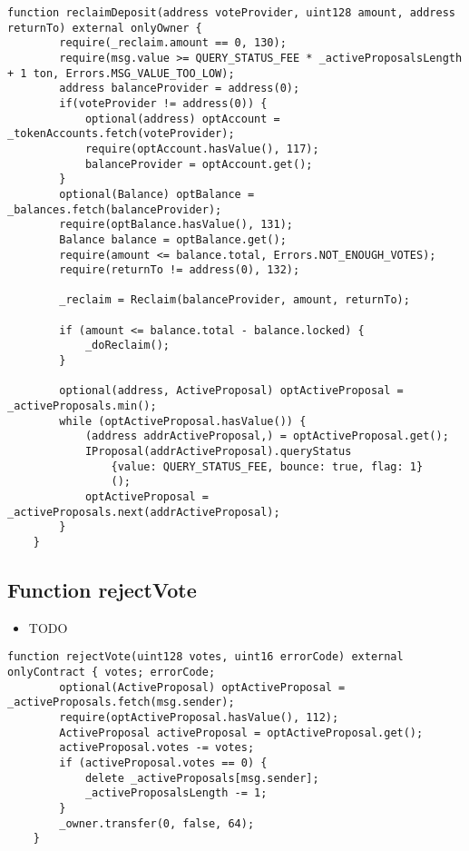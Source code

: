 \begin{lstlisting}[firstnumber=118]
    function reclaimDeposit(address voteProvider, uint128 amount, address returnTo) external onlyOwner {
        require(_reclaim.amount == 0, 130);
        require(msg.value >= QUERY_STATUS_FEE * _activeProposalsLength + 1 ton, Errors.MSG_VALUE_TOO_LOW);
        address balanceProvider = address(0);
        if(voteProvider != address(0)) {
            optional(address) optAccount = _tokenAccounts.fetch(voteProvider);
            require(optAccount.hasValue(), 117);
            balanceProvider = optAccount.get();
        }
        optional(Balance) optBalance = _balances.fetch(balanceProvider);
        require(optBalance.hasValue(), 131);
        Balance balance = optBalance.get();
        require(amount <= balance.total, Errors.NOT_ENOUGH_VOTES);
        require(returnTo != address(0), 132);

        _reclaim = Reclaim(balanceProvider, amount, returnTo);

        if (amount <= balance.total - balance.locked) {
            _doReclaim();
        }

        optional(address, ActiveProposal) optActiveProposal = _activeProposals.min();
        while (optActiveProposal.hasValue()) {
            (address addrActiveProposal,) = optActiveProposal.get();
            IProposal(addrActiveProposal).queryStatus
                {value: QUERY_STATUS_FEE, bounce: true, flag: 1}
                ();
            optActiveProposal = _activeProposals.next(addrActiveProposal);
        }
    }
\end{lstlisting}

\subsection{Function rejectVote}

\begin{itemize}
\item TODO
\end{itemize}

\begin{lstlisting}[firstnumber=106]
    function rejectVote(uint128 votes, uint16 errorCode) external onlyContract { votes; errorCode;
        optional(ActiveProposal) optActiveProposal = _activeProposals.fetch(msg.sender);
        require(optActiveProposal.hasValue(), 112);
        ActiveProposal activeProposal = optActiveProposal.get();
        activeProposal.votes -= votes;
        if (activeProposal.votes == 0) {
            delete _activeProposals[msg.sender];
            _activeProposalsLength -= 1;
        }
        _owner.transfer(0, false, 64);
    }
\end{lstlisting}

